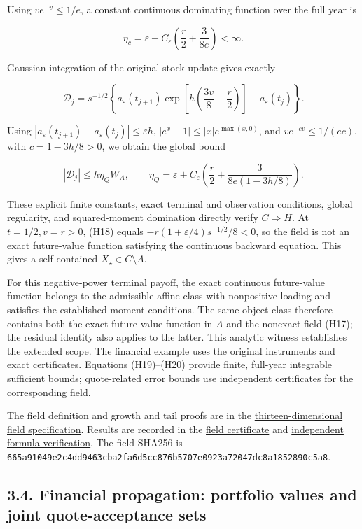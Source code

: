 \documentclass[a4paper,11pt]{article}
\begin{document}
Using \(ve^{-v}\le1/e\), a constant continuous dominating function over the full year is

\[
\eta_c=\varepsilon+C_\varepsilon\left(\frac r2+\frac3{8e}\right)<\infty.
\tag{H19}
\]

Gaussian integration of the original stock update gives exactly

\[
\mathscr D_j=s^{-1/2}
\left\{a_\varepsilon(t_{j+1})
\exp\!\left[h\left(\frac{3v}{8}-\frac r2\right)\right]
-a_\varepsilon(t_j)\right\}.
\]

Using \(|a_\varepsilon(t_{j+1})-a_\varepsilon(t_j)|\le\varepsilon h\),
\(|e^x-1|\le |x|e^{\max(x,0)}\), and
\(ve^{-cv}\le1/(ec)\), with \(c=1-3h/8>0\), we obtain the global bound

\[
|\mathscr D_j|\le h\eta_QW_A,\qquad
\eta_Q=\varepsilon+C_\varepsilon
\left(\frac r2+\frac3{8e(1-3h/8)}\right).
\tag{H20}
\]

These explicit finite constants, exact terminal and observation conditions, global regularity, and squared-moment domination directly verify \(C\Rightarrow H\). At \(t=1/2,v=r>0\), (H18) equals
\(-r(1+\varepsilon/4)s^{-1/2}/8<0\), so the field is not an exact future-value function satisfying the continuous backward equation. This gives a self-contained \(X_\star\in C\setminus A\).

For this negative-power terminal payoff, the exact continuous future-value function belongs to the admissible affine class with nonpositive loading and satisfies the established moment conditions. The same object class therefore contains both the exact future-value function in \(A\) and the nonexact field (H17); the residual identity also applies to the latter. This analytic witness establishes the extended scope. The financial example uses the original instruments and exact certificates. Equations (H19)–(H20) provide finite, full-year integrable sufficient bounds; quote-related error bounds use independent certificates for the corresponding field.

The field definition and growth and tail proofs are in the \href{../docs/classical-evidence.md}{thirteen-dimensional field specification}. Results are recorded in the \href{../code/classical/field-result.json}{field certificate} and \href{../code/classical/field-independent-readback.json}{independent formula verification}. The field SHA256 is \texttt{665a91049e2c4dd9463cba2fa6d5cc876b5707e0923a72047dc8a1852890c5a8}.

\subsection*{3.4. Financial propagation: portfolio values and joint quote-acceptance sets}
\end{document}
